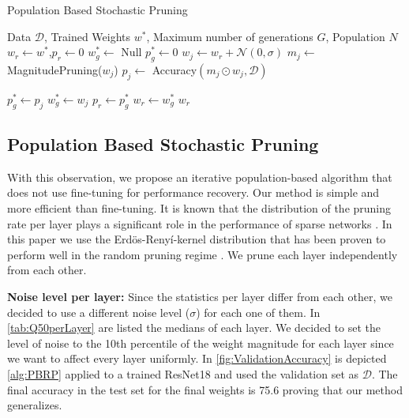 \begin{algorithm}[!tb]
   \caption{Population Based Stochastic Pruning}
   \label{alg:PBRP}
   \begin{algorithmic}[1]
     Data $\mathcal{D} $, Trained Weights $w^*$, Maximum number of generations $G$, Population $N$
     $w_r \gets w^*$,$p_r \gets 0$ 
    \STATE{}
   \STATE $w^*_g \gets$ Null
   \STATE $p^*_{g} \gets0$ 
   \STATE $w_j \gets w_r+ \mathcal{N}(0,\sigma)$ 
   \STATE $m_j \gets$ MagnitudePruning($w_j$)
   \STATE $p_j \gets$ Accuracy$(m_j\odot w_j,\mathcal{D})$

   \STATE $p^*_g\gets p_j$
   \STATE $w^*_g \gets w_j$
   \ENDIF
   \ENDFOR
   \STATE $p_r \gets p^*_g$
   \STATE $w_r \gets w^*_g$
   \ENDIF
   \ENDFOR
   \OUTPUT $w_r$
\end{algorithmic}
\end{algorithm}

\subsection{Population Based Stochastic Pruning}
With this observation, we propose an iterative population-based algorithm that does not use fine-tuning for performance recovery. Our method is simple and more efficient than fine-tuning.
It is known that the distribution of the pruning rate per layer plays a significant role in the performance of sparse networks
\cite{leeLayeradaptiveSparsityMagnitudebased2022}. In this paper we use  the Erdös-Renyí-kernel distribution \cite{evciRiggingLotteryMaking2020} that has been proven to perform well in the random pruning regime \cite{liuUnreasonableEffectivenessRandom2022}. We prune each layer independently from each other.

\textbf{Noise level per layer:}
Since the statistics per layer differ from each other, we decided to use a different noise level ($\sigma$) for each one of them. In \cref{tab:Q50perLayer} are listed the medians of each layer. We decided to set the level of noise to the 10th percentile of the weight magnitude for each layer since we want to affect every layer uniformly.
In \cref{fig:ValidationAccuracy} is depicted \cref{alg:PBRP} applied to a
trained ResNet18 and used the validation set as $\mathcal{D}$. The final
accuracy in the test set for the final weights is 75.6 proving that our method
generalizes.



